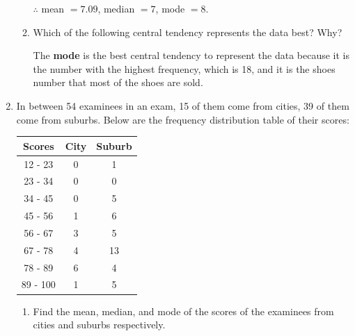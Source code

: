 \documentclass{report}
\begin{document}
\begin{multicols}{2}
\begin{enumerate}
\begin{enumerate}
                  $\therefore$ mean $= 7.09$, median $= 7$, mode $= 8$.

            \item Which of the following central tendency represents the data best? Why? \sol{}

                  The \textbf{mode} is the best central tendency to represent the data because it
                  is the number with the highest frequency, which is 18, and it is the shoes
                  number that most of the shoes are sold.
          \end{enumerate}
    \item In between 54 examinees in an exam, 15 of them come from cities, 39 of them
          come from suburbs. Below are the frequency distribution table of their scores:
          \begin{center}
            \begin{tabular}{|c|c|c|}
              \hline
              Scores   & City & Suburb \\ \hline
              12 - 23  & 0    & 1      \\
              23 - 34  & 0    & 0      \\
              34 - 45  & 0    & 5      \\
              45 - 56  & 1    & 6      \\
              56 - 67  & 3    & 5      \\
              67 - 78  & 4    & 13     \\
              78 - 89  & 6    & 4      \\
              89 - 100 & 1    & 5      \\
              \hline
            \end{tabular}
          \end{center}
          \begin{enumerate}
            \item Find the mean, median, and mode of the scores of the examinees from cities and
                  suburbs respectively. \sol{}


\end{enumerate}
\end{enumerate}
\end{multicols}
\end{document}
